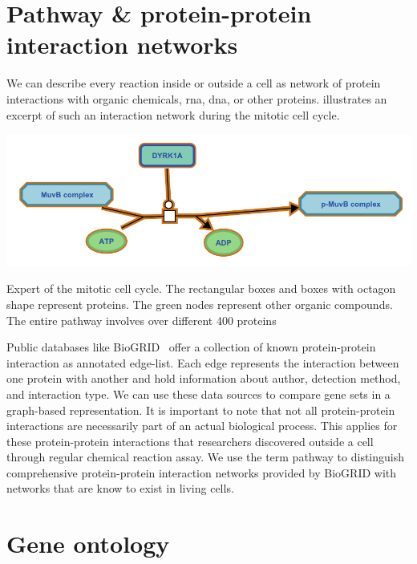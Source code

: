 \documentclass{thesisclass}
\begin{document}
\section{Pathway \& protein-protein interaction networks}

We can describe every reaction inside or outside a cell as network of protein interactions with organic chemicals, \acrshort{rna}, \acrshort{dna}, or other proteins.  illustrates an excerpt of such an interaction network during the mitotic cell cycle.

\begin{centeredFigure}[!h]
	\includegraphics[scale=0.8]{figures/introduction/pathway.pdf}
	\caption{Expert of the mitotic cell cycle.  The rectangular boxes and boxes with octagon shape represent proteins. The green nodes represent other organic compounds. The entire pathway involves over different 400 proteins}
	\label{fig:pathway}
\end{centeredFigure}

Public databases like BioGRID~\cite{doi:10.1093/nar/gkw1102} offer a collection of known protein-protein interaction as annotated edge-list. Each edge represents the interaction between one protein with another and hold information about author, detection method, and interaction type. We can use these data sources to compare gene sets in a graph-based representation. It is important to note that not all protein-protein interactions are necessarily part of an actual biological process. This applies for these  protein-protein interactions that researchers discovered outside a cell through regular chemical reaction assay. We use the term pathway to distinguish comprehensive protein-protein interaction networks provided by BioGRID with networks that are know to exist in living cells. 

\section{Gene ontology}

\end{document}
